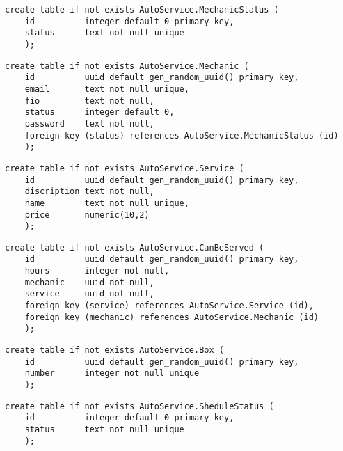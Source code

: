 \begin{lstlisting}[label=tb3, style=mystyle, caption=Создание таблицы MechanicStatus и соотвествующих ограничений целостности]
	create table if not exists AutoService.MechanicStatus (
	id			integer default 0 primary key,
	status		text not null unique
	);
\end{lstlisting}

\begin{lstlisting}[label=tb4, style=mystyle, caption=Создание таблицы Mechanic и соотвествующих ограничений целостности]
	create table if not exists AutoService.Mechanic (
	id			uuid default gen_random_uuid() primary key,
	email       text not null unique,
	fio         text not null,
	status		integer default 0,
	password 	text not null,
	foreign key (status) references AutoService.MechanicStatus (id)
	);
\end{lstlisting}

\begin{lstlisting}[label=tb5, style=mystyle, caption=Создание таблицы Service и соотвествующих ограничений целостности]
	create table if not exists AutoService.Service (
	id			uuid default gen_random_uuid() primary key,
	discription text not null,
	name        text not null unique,
	price		numeric(10,2)
	);
\end{lstlisting}

\begin{lstlisting}[label=tb6, style=mystyle, caption=Создание таблицы CanBeServed и соотвествующих ограничений целостности]
	create table if not exists AutoService.CanBeServed (
	id			uuid default gen_random_uuid() primary key,
	hours		integer not null,
	mechanic	uuid not null,
	service		uuid not null,
	foreign key (service) references AutoService.Service (id),
	foreign key (mechanic) references AutoService.Mechanic (id)
	);
\end{lstlisting}

\begin{lstlisting}[label=tb7, style=mystyle, caption=Создание таблицы Box и соотвествующих ограничений целостности]
	create table if not exists AutoService.Box (
	id			uuid default gen_random_uuid() primary key,
	number		integer not null unique
	);
\end{lstlisting}

\newpage

\begin{lstlisting}[label=tb8, style=mystyle, caption=Создание таблицы SheduleStatus и соотвествующих ограничений целостности]
	create table if not exists AutoService.SheduleStatus (
	id			integer default 0 primary key,
	status		text not null unique
	);
\end{lstlisting}

